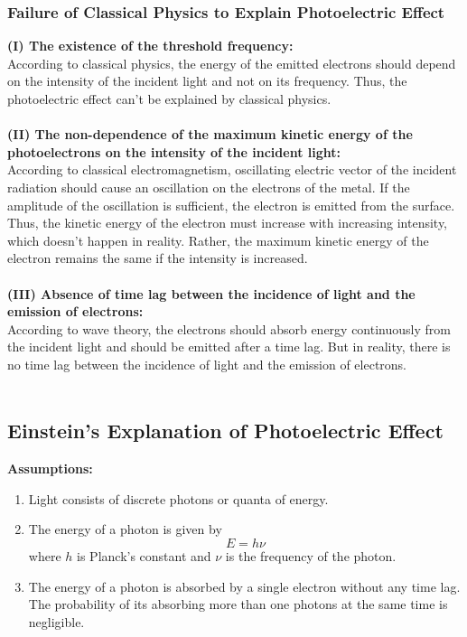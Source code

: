 \documentclass[12pt]{article}
\numberwithin{equation}{subsection}
\begin{document}
\subsubsection{Failure of Classical Physics to Explain Photoelectric Effect}
\textbf{(I) The existence of the threshold frequency:} \\
According to classical physics, the energy of the emitted electrons should depend on the intensity of the incident light and not on its frequency. Thus, the photoelectric effect can't be explained by classical physics. \\~\\

\textbf{(II) The non-dependence of the maximum kinetic energy of the photoelectrons on the intensity of the incident light:} \\
According to classical electromagnetism, oscillating electric vector of the incident radiation should cause an oscillation on the electrons of the metal. If the amplitude of the oscillation is sufficient, the electron is emitted from the surface. Thus, the kinetic energy of the electron must increase with increasing intensity, which doesn't happen in reality. Rather, the maximum kinetic energy of the electron remains the same if the intensity is increased.\\~\\

\textbf{(III) Absence of time lag between the incidence of light and the emission of electrons:} \\
According to wave theory, the electrons should absorb energy continuously from the incident light and should be emitted after a time lag. But in reality, there is no time lag between the incidence of light and the emission of electrons. \\~\\


\subsection{Einstein's Explanation of Photoelectric Effect}
\textbf{Assumptions:} \\
\begin{enumerate}
    \item Light consists of discrete photons or quanta of energy.
    \item The energy of a photon is given by \[
        E = h\nu
    \]
    where $h$ is Planck's constant and $\nu$ is the frequency of the photon.
    \item The energy of a photon is absorbed by a single electron without any time lag. The probability of its absorbing more than one photons at the same time is negligible.
\end{enumerate}
\end{document}

